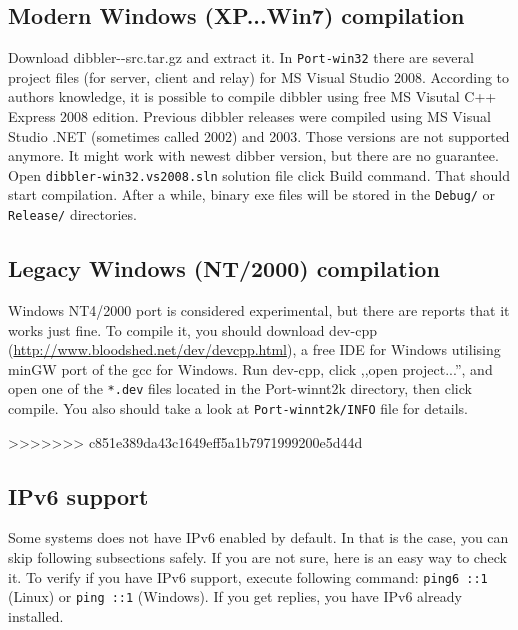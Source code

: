 \subsection{Modern Windows (XP...Win7) compilation}
Download dibbler-\version-src.tar.gz and extract it. In
\verb+Port-win32+ there are several project files (for server, client
and relay) for MS Visual Studio 2008. According to authors knowledge,
it is possible to compile dibbler using free MS Visutal C++ Express
2008 edition. Previous dibbler releases were compiled using MS Visual
Studio .NET (sometimes called 2002) and 2003. Those versions are not
supported anymore. It might work with newest dibber version, but there
are no guarantee. Open \verb+dibbler-win32.vs2008.sln+ solution file
click Build command. That should start compilation. After a while,
binary exe files will be stored in the \verb+Debug/+ or
\verb+Release/+ directories.

\subsection{Legacy Windows (NT/2000) compilation}
Windows NT4/2000 port is considered experimental, but there are reports
that it works just fine. To compile it, you should download dev-cpp
(\url{http://www.bloodshed.net/dev/devcpp.html}), a free IDE for
Windows utilising minGW port of the gcc for Windows. Run dev-cpp,
click ,,open project...'', and open one of the \verb+*.dev+ files located
in the Port-winnt2k directory, then click compile. You also should
take a look at \verb+Port-winnt2k/INFO+ file for details.

>>>>>>> c851e389da43c1649eff5a1b7971999200e5d44d

\subsection{IPv6 support}
Some systems does not have IPv6 enabled by default. In that is the case,
you can skip following subsections safely. If you are not sure, here is
an easy way to check it. To verify if you have IPv6 support, execute
following command: \verb+ping6 ::1+ (Linux) or \verb+ping ::1+
(Windows). If you get replies, you have IPv6 already installed.

